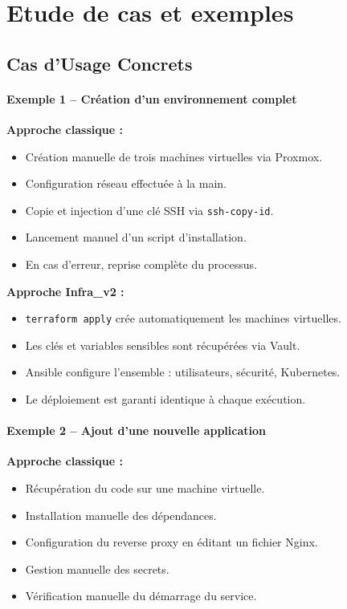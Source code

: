 \section{Etude de cas et exemples}
\subsection{Cas d’Usage Concrets}

\paragraph{Exemple 1 -- Création d’un environnement complet}

\textbf{Approche classique :}
\begin{itemize}
	\item Création manuelle de trois machines virtuelles via Proxmox.
	\item Configuration réseau effectuée à la main.
	\item Copie et injection d’une clé SSH via \texttt{ssh-copy-id}.
	\item Lancement manuel d’un script d’installation.
	\item En cas d’erreur, reprise complète du processus.
\end{itemize}

\textbf{Approche Infra\_v2 :}
\begin{itemize}
	\item \texttt{terraform apply} crée automatiquement les machines virtuelles.
	\item Les clés et variables sensibles sont récupérées via Vault.
	\item Ansible configure l’ensemble : utilisateurs, sécurité, Kubernetes.
	\item Le déploiement est garanti identique à chaque exécution.
\end{itemize}

\paragraph{Exemple 2 -- Ajout d’une nouvelle application}

\textbf{Approche classique :}
\begin{itemize}
	\item Récupération du code sur une machine virtuelle.
	\item Installation manuelle des dépendances.
	\item Configuration du reverse proxy en éditant un fichier Nginx.
	\item Gestion manuelle des secrets.
	\item Vérification manuelle du démarrage du service.
\end{itemize}

